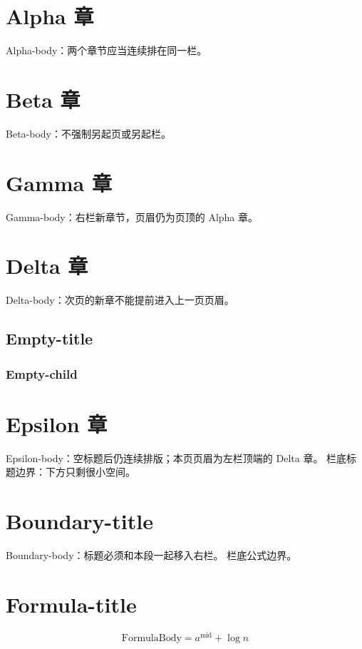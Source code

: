 \documentclass{article}
\begin{document}
\section{Alpha 章}
Alpha-body：两个章节应当连续排在同一栏。
\section{Beta 章}
Beta-body：不强制另起页或另起栏。
\newpage
\section{Gamma 章}
Gamma-body：右栏新章节，页眉仍为页顶的 Alpha 章。
\clearpage
\section{Delta 章}
Delta-body：次页的新章不能提前进入上一页页眉。
\subsection{Empty-title}
\subsubsection{Empty-child}
\section{Epsilon 章}
Epsilon-body：空标题后仍连续排版；本页页眉为左栏顶端的 Delta 章。
\clearpage
\noindent 栏底标题边界：下方只剩很小空间。
\par\vspace*{\dimexpr\pagegoal-\pagetotal-.5\baselineskip\relax}
\section{Boundary-title}
Boundary-body：标题必须和本段一起移入右栏。
\clearpage
\noindent 栏底公式边界。
\par\vspace*{\dimexpr\pagegoal-\pagetotal-.5\baselineskip\relax}
\section{Formula-title}
\[\mathrm{FormulaBody}=a^\mathrm{mid}+\log n\]
\end{document}
